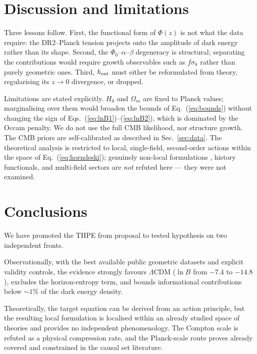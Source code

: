 \documentclass[aps,prd,twocolumn,superscriptaddress,nofootinbib,floatfix]{revtex4-2}
\newcommand{\LCDM}{\ensuremath{\Lambda}CDM}
\begin{document}
\section{Discussion and limitations}
\label{sec:discussion}

Three lessons follow. First, the functional form of $\Phi(z)$ is not
what the data require: the DR2--Planck tension projects onto the
amplitude of dark energy rather than its shape. Second, the
$\Phi_0$--$\alpha$--$\beta$ degeneracy is structural; separating the
contributions would require growth observables such as $f\sigma_8$
rather than purely geometric ones. Third, $h_{\rm ent}$ must either be
reformulated from theory, regularising its $z\to0$ divergence, or
dropped.

Limitations are stated explicitly. $H_0$ and $\Omega_m$ are fixed to
Planck values; marginalising over them would broaden the bounds of
Eq.~(\ref{eq:bounds}) without changing the sign of
Eqs.~(\ref{eq:lnB1})--(\ref{eq:lnB2}), which is dominated by the Occam
penalty. We do not use the full CMB likelihood, nor structure growth.
The CMB priors are self-calibrated as described in
Sec.~\ref{sec:data}. The theoretical analysis is restricted to local,
single-field, second-order actions within the space of
Eq.~(\ref{eq:horndeski}); genuinely non-local formulations
\cite{Deser2007}, history functionals, and multi-field sectors are
\emph{not} refuted here --- they were not examined.

\section{Conclusions}
\label{sec:conclusions}

We have promoted the THPE from proposal to tested hypothesis on two
independent fronts.

Observationally, with the best available public geometric datasets and
explicit validity controls, the evidence strongly favours \LCDM{}
($\ln B$ from $-7.4$ to $-14.8$), excludes the horizon-entropy term, and
bounds informational contributions below $\sim1\%$ of the dark energy
density.

Theoretically, the target equation can be derived from an action
principle, but the resulting local formulation is localised within an
already studied space of theories and provides no independent
phenomenology. The Compton scale is refuted as a physical compression
rate, and the Planck-scale route proves already covered and constrained
in the causal set literature.
\end{document}
